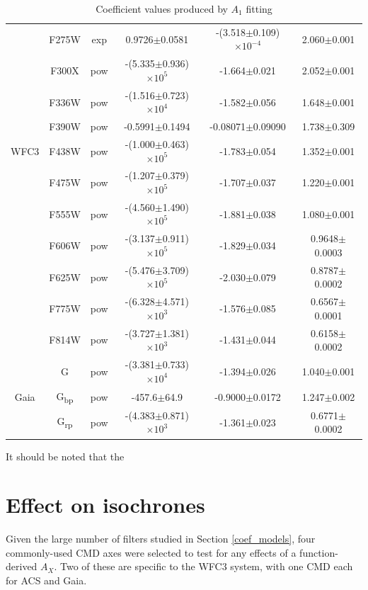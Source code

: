 \documentclass[12pt, a4paper]{report}
\begin{document}
\begin{table}
\begin{center}
\begin{tabular}{cccccc}
& F275W & exp & 0.9726$\pm$0.0581 & -(3.518$\pm$0.109)$\times 10^{-4}$ & 2.060$\pm$0.001 \\
& F300X & pow & -(5.335$\pm$0.936)$\times 10^{5}$ & -1.664$\pm$0.021 & 2.052$\pm$0.001 \\
& F336W & pow & -(1.516$\pm$0.723)$\times 10^{4}$ & -1.582$\pm$0.056 & 1.648$\pm$0.001 \\
& F390W & pow & -0.5991$\pm$0.1494 & -0.08071$\pm$0.09090 & 1.738$\pm$0.309 \\
WFC3 & F438W & pow & -(1.000$\pm$0.463)$\times 10^{5}$ & -1.783$\pm$0.054 & 1.352$\pm$0.001 \\
& F475W & pow & -(1.207$\pm$0.379)$\times 10^{5}$ & -1.707$\pm$0.037 & 1.220$\pm$0.001 \\
& F555W & pow & -(4.560$\pm$1.490)$\times 10^{5}$ & -1.881$\pm$0.038 & 1.080$\pm$0.001 \\
& F606W & pow & -(3.137$\pm$0.911)$\times 10^{5}$ & -1.829$\pm$0.034 & 0.9648$\pm$0.0003 \\
& F625W & pow & -(5.476$\pm$3.709)$\times 10^{5}$ & -2.030$\pm$0.079 & 0.8787$\pm$0.0002 \\
& F775W & pow & -(6.328$\pm$4.571)$\times 10^{3}$ & -1.576$\pm$0.085 & 0.6567$\pm$0.0001 \\
& F814W & pow & -(3.727$\pm$1.381)$\times 10^{3}$ & -1.431$\pm$0.044 & 0.6158$\pm$0.0002 \\ \hline

& G & pow & -(3.381$\pm$0.733)$\times 10^{4}$ & -1.394$\pm$0.026 & 1.040$\pm$0.001 \\
Gaia & G\textsubscript{bp} & pow & -457.6$\pm$64.9 & -0.9000$\pm$0.0172 & 1.247$\pm$0.002 \\
& G\textsubscript{rp} & pow & -(4.383$\pm$0.871)$\times 10^{3}$ & -1.361$\pm$0.023 & 0.6771$\pm$0.0002 \\ \hline

\end{tabular}
\caption{Coefficient values produced by $A_{1}$ fitting}
\label{simpfunc_coeffs_table}
\end{center}
\end{table}

It should be noted that the 

\section{Effect on isochrones}
Given the large number of filters studied in Section \ref{coef_models}, four commonly-used CMD axes were selected to test for any effects of a function-derived $A_{X}$. Two of these are specific to the WFC3 system, with one CMD each for ACS and Gaia.
\end{document}
